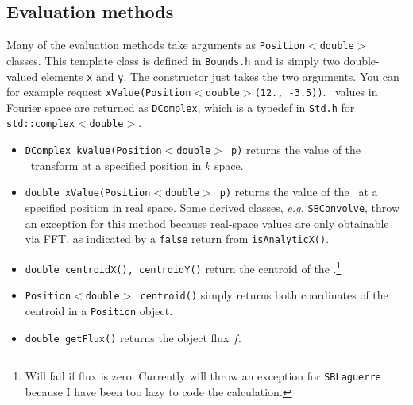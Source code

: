\documentclass[11pt,preprint,flushrt]{aastex}
\begin{document}
\subsection{Evaluation methods}
Many of the evaluation methods take arguments as {\tt Position$<$double$>$} classes.  This template class is defined in {\tt Bounds.h} and is simply two double-valued elements {\tt x} and {\tt y}.  The constructor just takes the two arguments.  You can for example request {\tt xValue(Position$<$double$>$(12., -3.5))}.  \sbp\ values in Fourier space are returned as {\tt DComplex}, which is a typedef in {\tt Std.h} for {\tt std::complex$<$double$>$}.

\begin{itemize}
\item {\tt DComplex kValue(Position$<$double$>$ p)} returns the value of the \sbp\ transform at a specified position in $k$ space.
\item {\tt double xValue(Position$<$double$>$ p)} returns the value of the \sbp\ at a specified position in real space.  Some derived classes, {\it e.g.} {\tt SBConvolve}, throw an exception for this method because real-space values are only obtainable via FFT, as indicated by a {\tt false} return from {\tt isAnalyticX()}.
\item {\tt  double centroidX(), centroidY()} return the centroid of the \sbp.\footnote{Will fail if flux is zero.  Currently will throw an exception for {\tt SBLaguerre} because I have been too lazy to code the calculation.}
\item {\tt  Position$<$double$>$ centroid()} simply returns both coordinates of the centroid in a {\tt Position} object.
\item {\tt double getFlux()} returns the object flux $f$.
\end{itemize}
\end{document}
